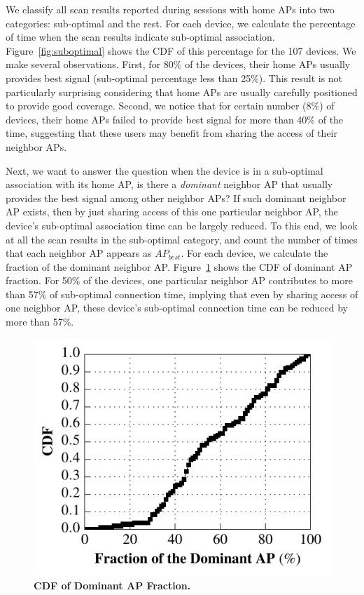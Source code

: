 We classify all scan results reported during \wifi{} sessions with home APs into
two categories: sub-optimal and the rest. For each device, we calculate the
percentage of time when the scan results indicate sub-optimal association.
Figure~\ref{fig:suboptimal} shows the CDF of this percentage for 
the 107 devices. We make several observations. First, for 80\% of the devices,
their home APs usually provides best signal (sub-optimal percentage less than
25\%). This result is not particularly surprising considering that home APs are
usually carefully positioned to provide good coverage. Second, we notice
that for certain number (8\%) of devices, their home APs failed to provide best
signal for more than 40\% of the time, suggesting that these users may benefit
from sharing the \wifi{} access of their neighbor APs.

Next, we want to answer the question when the device is in a sub-optimal association
with its home AP, is there a \textit{dominant} neighbor AP that
usually provides the best signal among other neighbor APs? If such dominant
neighbor AP exists, then by just sharing access of this one particular neighbor
AP, the device's sub-optimal association time can be largely reduced. To this
end, we look at all the scan results in the sub-optimal category, and count the
number of times that each neighbor AP appears as $AP_{best}$. For each device,
we calculate the fraction of the dominant neighbor AP. Figure~\ref{fig:dominantap}
shows the CDF of dominant AP fraction. For 50\% of the devices, one particular
neighbor AP contributes to more than 57\% of sub-optimal connection time,
implying that even by sharing \wifi{} access of one neighbor AP, these device's
sub-optimal connection time can be reduced by more than 57\%.

\begin{figure}[t]
  \centering
  \includegraphics[width=\columnwidth]{./figures/BetterNeighborAPFigure.pdf}
  \caption{\textbf{CDF of Dominant AP Fraction.}}
  \label{fig:dominantap}
\end{figure}


